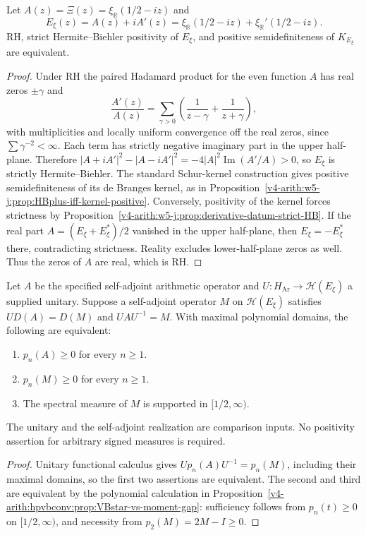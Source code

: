 \begin{theorem}
\label{v4-arith:hpvbconv:thm:de-branges-1994}
Let \(A(z)=\Xi(z)=\xi_{\mathbb R}(1/2-iz)\) and
\[
 E_\xi(z)=A(z)+iA'(z)
 =\xi_{\mathbb R}(1/2-iz)+\xi_{\mathbb R}'(1/2-iz).
\]
RH, strict Hermite--Biehler positivity of \(E_\xi\), and positive
semidefiniteness of \(K_{E_\xi}\) are equivalent.
\end{theorem}
\begin{proof}
Under RH the paired Hadamard product for the even function \(A\)
has real zeros \(\pm\gamma\) and
\[
 \frac{A'(z)}{A(z)}=\sum_{\gamma>0}
 \left(\frac1{z-\gamma}+\frac1{z+\gamma}\right),
\]
with multiplicities and locally uniform convergence off the real
zeros, since \(\sum\gamma^{-2}<\infty\). Each term has strictly
negative imaginary part in the upper half-plane. Therefore
\(|A+iA'|^2-|A-iA'|^2=-4|A|^2\operatorname{Im}(A'/A)>0\),
so \(E_\xi\) is strictly Hermite--Biehler. The standard Schur-kernel
construction gives positive semidefiniteness of its de Branges kernel,
as in Proposition~\ref{v4-arith:w5-j:prop:HBplus-iff-kernel-positive}.
Conversely, positivity of the kernel forces strictness by
Proposition~\ref{v4-arith:w5-j:prop:derivative-datum-strict-HB}.
If the real part \(A=(E_\xi+E_\xi^*)/2\) vanished in the upper
half-plane, then \(E_\xi=-E_\xi^*\) there, contradicting strictness.
Reality excludes lower-half-plane zeros as well. Thus the zeros
of \(A\) are real, which is RH.
\end{proof}

\begin{proposition}
\label{v4-arith:hpvbconv:prop:VBstar-de-branges}
Let \(A\) be the specified self-adjoint arithmetic operator and
\(U:H_{\mathrm{Ar}}\to\mathcal H(E_\xi)\) a supplied unitary.
Suppose a self-adjoint operator \(M\) on \(\mathcal H(E_\xi)\)
satisfies \(U D(A)=D(M)\) and \(UAU^{-1}=M\).
With maximal polynomial domains, the following are equivalent:
\begin{enumerate}
\item \(p_n(A)\geq0\) for every \(n\geq1\).
\item \(p_n(M)\geq0\) for every \(n\geq1\).
\item The spectral measure of \(M\) is supported in
\([1/2,\infty)\).
\end{enumerate}
The unitary and the self-adjoint realization are comparison inputs.
No positivity assertion for arbitrary signed measures is required.
\end{proposition}
\begin{proof}
Unitary functional calculus gives
\(U p_n(A)U^{-1}=p_n(M)\), including their maximal domains,
so the first two assertions are equivalent. The second and third
are equivalent by the polynomial calculation in
Proposition~\ref{v4-arith:hpvbconv:prop:VBstar-vs-moment-gap}:
sufficiency follows from \(p_n(t)\geq0\) on \([1/2,\infty)\),
and necessity from \(p_2(M)=2M-I\geq0\).
\end{proof}


